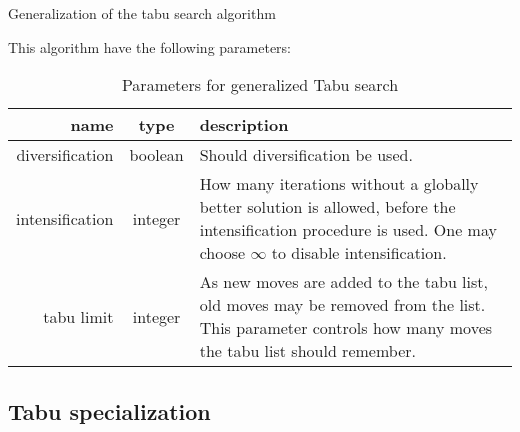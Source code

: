 \begin{algorithm}[H]
  \caption{Generalization of the tabu search algorithm}
  \begin{algorithmic}[1]
     
     
     
    \State
    \Repeat
         
            \State {}
        \Else
                 
            \EndIf
             
        \EndIf
        
        \EndIf
    \State {}
    \EndFunction
  \end{algorithmic}
\end{algorithm}

This algorithm have the following parameters:

\begin{table}[H]
\centering
\begin{tabular}{r|c|p{7cm}}
	name & type & description \\ \hline
	diversification & boolean & Should diversification be used. \\
	intensification & integer & How many iterations without a globally better solution is allowed, before the intensification procedure is used. One may choose $\infty$ to disable intensification. \\
	tabu limit & integer & As new moves are added to the tabu list, old moves may be removed from the list. This parameter controls how many moves the tabu list should remember.
\end{tabular}
\caption{Parameters for generalized Tabu search}
\end{table}

\subsection{Tabu specialization}

